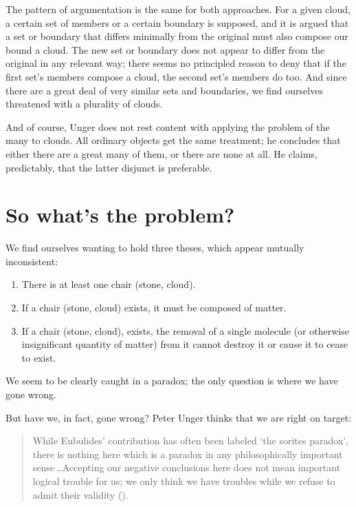 \documentclass[11pt]{standalone} \newif\ifstandlone \standalonetrue
\newenvironment{squote}{%
	\begin{quote}\begin{singlespace}%
	}{%
	\end{singlespace}\end{quote}}
\begin{document}
\begin{spacing}{1.5}
The pattern of argumentation is the same for both approaches.  For a
given cloud, a certain set of members or a certain boundary is
supposed, and it is argued that a set or boundary that differs
minimally from the original must also compose our bound a cloud.  The
new set or boundary does not appear to differ from the original in any
relevant way; there seems no principled reason to deny that if the
first set's members compose a cloud, the second set's members do too.
And since there are a great deal of very similar sets and boundaries,
we find ourselves threatened with a plurality of clouds.

And of course, Unger does not rest content with applying the problem
of the many to clouds.  All ordinary objects get the same treatment;
he concludes that either there are a great many of them, or there are
none at all.  He claims, predictably, that the latter disjunct is
preferable.

\section{So what's the problem?}
We find ourselves wanting to hold three theses, which appear mutually
inconsistent:

\begin{enumerate}
  \item There is at least one chair (stone, cloud).
  \item If a chair (stone, cloud) exists, it must be composed of
    matter.
  \item If a chair (stone, cloud), exists, the removal of a single
    molecule (or otherwise insignificant quantity of matter) from it
    cannot destroy it or cause it to cease to exist.
\end{enumerate}

We seem to be clearly caught in a paradox; the only question is where
we have gone wrong.

But have we, in fact, gone wrong?  Peter Unger thinks that we are
right on target:

\begin{squote}
While Eubulides' contribution has often been labeled `the sorites
paradox', there is nothing here which is a paradox in any
philosophically important sense\,\ldots Accepting our negative
conclusions here does not mean important logical trouble for us; we
only think we have troubles while we refuse to admit their validity
(\citeyear[145]{unger1979}).
\end{squote}


\end{spacing}
\end{document}
